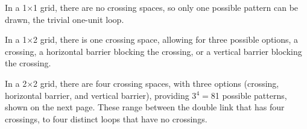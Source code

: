 
In a 1$\times$1 grid, there are no crossing spaces, so only one possible pattern can be drawn, the trivial one-unit loop.

\vspace{0.5cm}

\begin{center}

\end{center}

\vspace{0.5cm}


\noindent
In a 1$\times$2 grid, there is one crossing space, allowing for three possible options, a crossing, a horizontal barrier blocking the crossing, or a vertical barrier blocking the crossing.

\vspace{0.5cm}

\begin{center}
\hspace{0.5cm}
\hspace{0.5cm}

\end{center}

\vspace{0.5cm}

\noindent
In a 2$\times$2 grid, there are four crossing spaces, with three options (crossing, horizontal barrier, and vertical barrier), providing 3$^4=$81 possible patterns, shown on the next page. These range between the double link that has four crossings, to four distinct loops that have no crossings.

\vspace{0.5cm}
\begin{center}

\hspace{0.5cm}

\end{center}

\newpage


\noindent
\scalebox{0.6}{
\begin{minipage}{18cm}

\end{minipage}
}
